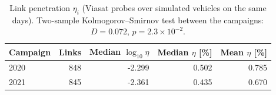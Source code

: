 \begin{table}[htbp]
\centering
\caption{Link penetration $\eta_i$ (Viasat probes over simulated vehicles on the same days). Two-sample Kolmogorov--Smirnov test between the campaigns: $D=0.072$, $p=2.3\times10^{-2}$.}
\label{tab:penetration-summary}
\begin{tabular}{@{}lrrrr@{}}
\toprule
Campaign & Links & Median $\log_{10}\eta$ & Median $\eta$ [\%] & Mean $\eta$ [\%] \\
\midrule
2020 & 848 & -2.299 & 0.502 & 0.785 \\
2021 & 845 & -2.361 & 0.435 & 0.670 \\
\bottomrule
\end{tabular}
\end{table}
